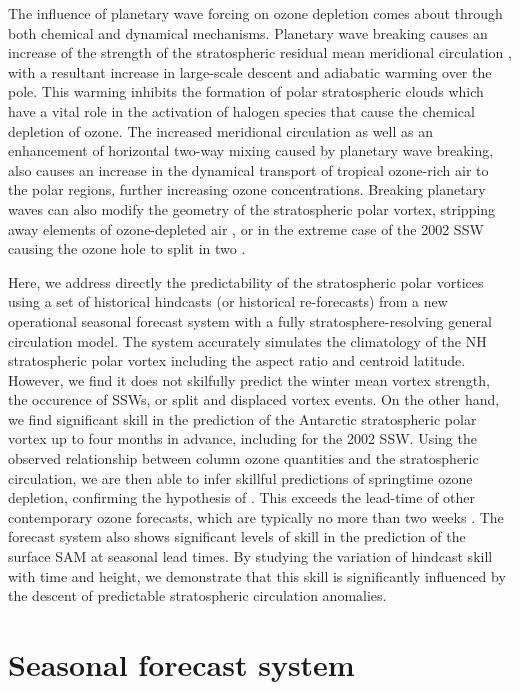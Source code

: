 The influence of planetary wave forcing on ozone depletion comes about through
both chemical and dynamical mechanisms. Planetary wave breaking causes an
increase of the strength of the stratospheric residual mean meridional
circulation \citep{Haynes1991}, with a resultant increase in large-scale descent
and adiabatic warming over the pole. This warming inhibits the formation of
polar stratospheric clouds which have a vital role in the activation of halogen
species that cause the chemical depletion of ozone. The increased meridional
circulation as well as an enhancement of horizontal two-way mixing caused by
planetary wave breaking, also causes an increase in the dynamical transport of
tropical ozone-rich air to the polar regions, further increasing ozone
concentrations.  Breaking planetary waves can also modify the geometry of the
stratospheric polar vortex, stripping away elements of ozone-depleted air
\citep{Waugh1994}, or in the extreme case of the 2002 SSW causing the ozone hole
to split in two \citep{Charlton2005a}.

Here, we address directly the predictability of the stratospheric polar vortices
using a set of historical hindcasts (or historical re-forecasts) from a new
operational seasonal forecast system with a fully stratosphere-resolving general
circulation model. The system accurately simulates the climatology of the NH
stratospheric polar vortex including the aspect ratio and centroid
latitude. However, we find it does not skilfully predict the winter mean vortex
strength, the occurence of SSWs, or split and displaced vortex events. On the
other hand, we find significant skill in the prediction of the Antarctic
stratospheric polar vortex up to four months in advance, including for the 2002
SSW. Using the observed relationship between column ozone quantities and the
stratospheric circulation, we are then able to infer skillful predictions of
springtime ozone depletion, confirming the hypothesis of \citet{Salby2012}. This
exceeds the lead-time of other contemporary ozone forecasts, which are typically
no more than two weeks \citep{Eskes2005}. The forecast system also shows
significant levels of skill in the prediction of the surface SAM at seasonal
lead times. By studying the variation of hindcast skill with time and height, we
demonstrate that this skill is significantly influenced by the descent of
predictable stratospheric circulation anomalies.

\section{Seasonal forecast system}
\label{sec:seas-forec-syst}

